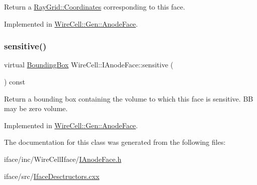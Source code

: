 Return a \hyperlink{class_wire_cell_1_1_ray_grid_1_1_coordinates}{Ray\+Grid\+::\+Coordinates} corresponding to this face. 



Implemented in \hyperlink{class_wire_cell_1_1_gen_1_1_anode_face_a1ee64f5c3c63f9d44907fd06d6bb6abe}{Wire\+Cell\+::\+Gen\+::\+Anode\+Face}.

\mbox{\label{class_wire_cell_1_1_i_anode_face_a74d5eec4031d0c78a17cf80d5ccae2cc}} 
\subsubsection{\texorpdfstring{sensitive()}{sensitive()}}
{\footnotesize\ttfamily virtual \hyperlink{class_wire_cell_1_1_bounding_box}{Bounding\+Box} Wire\+Cell\+::\+I\+Anode\+Face\+::sensitive (\begin{DoxyParamCaption}{ }\end{DoxyParamCaption}) const\hspace{0.3cm}{\ttfamily [pure virtual]}}

Return a bounding box containing the volume to which this face is sensitive. BB may be zero volume. 

Implemented in \hyperlink{class_wire_cell_1_1_gen_1_1_anode_face_a8e9613ee708a9b68c939d135e425e488}{Wire\+Cell\+::\+Gen\+::\+Anode\+Face}.



The documentation for this class was generated from the following files\+:\begin{DoxyCompactItemize}
\item 
iface/inc/\+Wire\+Cell\+Iface/\hyperlink{_i_anode_face_8h}{I\+Anode\+Face.\+h}\item 
iface/src/\hyperlink{_iface_desctructors_8cxx}{Iface\+Desctructors.\+cxx}\end{DoxyCompactItemize}
